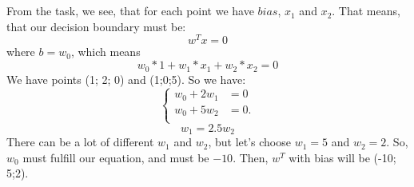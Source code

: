 \documentclass[11pt]{article}
\newcommand{\exercise}{\section{}}
\begin{document}
\exercise
From the task, we see, that for each point we have $bias$, $x_1$ and $x_2$. That means, that our decision boundary must be:
$$w^Tx=0$$ where $b=w_0$, which means
$$w_0*1+w_1*x_1+w_2*x_2=0$$
We have points (1; 2; 0) and (1;0;5). So we have: 
$$ \left\{
\begin{aligned}
w_0+2w_1&=0\\
w_0+5w_2 & = 0.\\
\end{aligned}
\right. $$
$$w_1=2.5w_2$$
There can be a lot of different $w_1$ and $w_2$, but let's choose $w_1=5$ and $w_2=2$.
So, $w_0$ must fulfill our equation, and must be $-10$.
Then, $w^T$ with bias will be (-10; 5;2).
\end{document}

